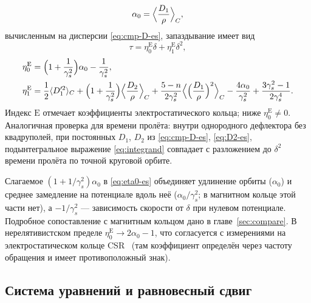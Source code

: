 \begin{equation}
\label{eq:alpha0-es}
\alpha_0=\Bigl\langle\frac{D_1}{\rho}\Bigr\rangle_C,
\end{equation}
вычисленным на дисперсии \eqref{eq:cmp-D-es}, запаздывание имеет вид
\begin{equation}
\label{eq:tau-es-d}
\tau=\eta_0^{\mathrm{E}}\delta+\eta_1^{\mathrm{E}}\delta^2,
\end{equation}
\begin{align}
\eta_0^{\mathrm{E}}
&=\Bigl(1+\frac{1}{\gamma_s^2}\Bigr)\alpha_0-\frac{1}{\gamma_s^2},
\label{eq:eta0-es}\\
\eta_1^{\mathrm{E}}
&=\frac12\langle D_1'^2\rangle_C
+\Bigl(1+\frac{1}{\gamma_s^2}\Bigr)
\Bigl\langle\frac{D_2}{\rho}\Bigr\rangle_C
+\frac{5-n}{2\gamma_s^2}
\Bigl\langle\Bigl(\frac{D_1}{\rho}\Bigr)^2\Bigr\rangle_C
-\frac{4\alpha_0}{\gamma_s^2}
+\frac{3\gamma_s^2-1}{2\gamma_s^4}.
\label{eq:eta1-es}
\end{align}
Индекс $\mathrm{E}$ отмечает коэффициенты электростатического кольца; ниже $\eta_0^{\mathrm{E}}\neq 0$. Аналогичная проверка для времени пролёта: внутри однородного дефлектора без квадруполей, при постоянных $D_1$, $D_2$ из \eqref{eq:cmp-D-es}, \eqref{eq:D2-es}, подынтегральное выражение \eqref{eq:integrand} совпадает с разложением до $\delta^2$ времени пролёта по точной круговой орбите.

Слагаемое $(1+1/\gamma_s^2)\alpha_0$ в \eqref{eq:eta0-es} объединяет удлинение орбиты ($\alpha_0$) и среднее замедление на потенциале вдоль неё ($\alpha_0/\gamma_s^2$; в магнитном кольце этой части нет), а $-1/\gamma_s^2$ --- зависимость скорости от $\delta$ при нулевом потенциале. Подробное сопоставление с магнитным кольцом дано в главе~\ref{sec:compare}.
В нерелятивистском пределе $\eta_0^{\mathrm{E}}\to 2\alpha_0-1$, что согласуется с измерениями на электростатическом кольце CSR~\cite{Grieser2017} (там коэффициент определён через частоту обращения и имеет противоположный знак).

\subsection{Система уравнений и равновесный сдвиг}

